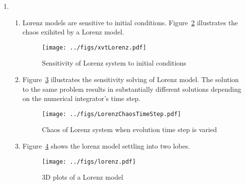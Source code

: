 \documentclass[12pt,a4]{article}
\begin{document}
\begin{enumerate}
\begin{enumerate}
      \item
        Figure~\ref{fig:SIRbetaHalved} shows that halving $\beta$ (the contagiousness parameter) has a large impact on the infection curve.
        \begin{figure}[H]
          \centering
          \texttt{[image: ../figs/SIRbetaHalved.pdf]}
          \caption{Evolution of an SIR model through time}
          \label{fig:SIRbetaHalved}
        \end{figure}
  \end{enumerate}
  \item
    \begin{enumerate}
      \item
        Lorenz models are sensitive to initial conditions.
        Figure~\ref{fig:xvtLorenz} illustrates the chaos exihited by a Lorenz model.
        \begin{figure}[H]
          \centering
          \texttt{[image: ../figs/xvtLorenz.pdf]}
          \caption{Sensitivity of Lorenz system to initial conditions}
          \label{fig:xvtLorenz}
        \end{figure}
      \item
        Figure~\ref{fig:LorenzChaosTimeStep} illustrates the sensitivity solving of Lorenz model.
        The solution to the same problem results in substantially different solutions depending on the numerical integrator's time step.
        \begin{figure}[H]
          \centering
          \texttt{[image: ../figs/LorenzChaosTimeStep.pdf]}
          \caption{Chaos of Lorenz system when evolution time step is varied}
          \label{fig:LorenzChaosTimeStep}
        \end{figure}
      \item
        Figure~\ref{fig:lorenz} shows the lorenz model settling into two lobes.
        \begin{figure}[H]
          \centering
          \texttt{[image: ../figs/lorenz.pdf]}
          \caption{3D plots of a Lorenz model}
          \label{fig:lorenz}
        \end{figure}
  \end{enumerate}
\end{enumerate}
\end{document}
